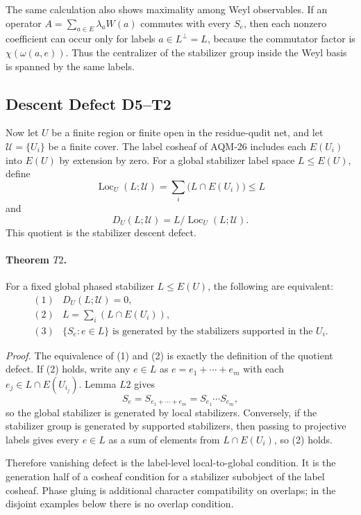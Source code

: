 The same calculation also shows maximality among Weyl observables.  If an
operator \(A=\sum_{a\in E}\lambda_aW(a)\) commutes with every \(S_e\), then
each nonzero coefficient can occur only for labels \(a\in L^\perp=L\), because
the commutator factor is \(\chi(\omega(a,e))\).  Thus the centralizer of the
stabilizer group inside the Weyl basis is spanned by the same labels.

\subsection{Descent Defect D5--T2}

Now let \(U\) be a finite region or finite open in the residue-qudit net, and
let \(\mathcal U=\{U_i\}\) be a finite cover.  The label cosheaf of AQM-26
includes each \(E(U_i)\) into \(E(U)\) by extension by zero.  For a global
stabilizer label space \(L\leq E(U)\), define
\[
  \operatorname{Loc}_U(L;\mathcal U)
  =
  \sum_i\bigl(L\cap E(U_i)\bigr)
  \leq L
\]
and
\[
  D_U(L;\mathcal U)
  =
  L/\operatorname{Loc}_U(L;\mathcal U).
\]
This quotient is the stabilizer descent defect.

\paragraph{Theorem \(T2\).}
For a fixed global phased stabilizer \(L\leq E(U)\), the following are
equivalent:
\[
\begin{array}{ll}
(1)&D_U(L;\mathcal U)=0,\\
(2)&L=\sum_i(L\cap E(U_i)),\\
(3)&\{S_e:e\in L\}\text{ is generated by the stabilizers supported in the }
    U_i.
\end{array}
\]

\emph{Proof.}
The equivalence of (1) and (2) is exactly the definition of the quotient
defect.  If (2) holds, write any \(e\in L\) as \(e=e_1+\cdots+e_m\) with each
\(e_j\in L\cap E(U_{i_j})\).  Lemma \(L2\) gives
\[
  S_e=S_{e_1+\cdots+e_m}=S_{e_1}\cdots S_{e_m},
\]
so the global stabilizer is generated by local stabilizers.  Conversely, if
the stabilizer group is generated by supported stabilizers, then passing to
projective labels gives every \(e\in L\) as a sum of elements from
\(L\cap E(U_i)\), so (2) holds.

Therefore vanishing defect is the label-level local-to-global condition.  It
is the generation half of a cosheaf condition for a stabilizer subobject of
the label cosheaf.  Phase gluing is additional character compatibility on
overlaps; in the disjoint examples below there is no overlap condition.

